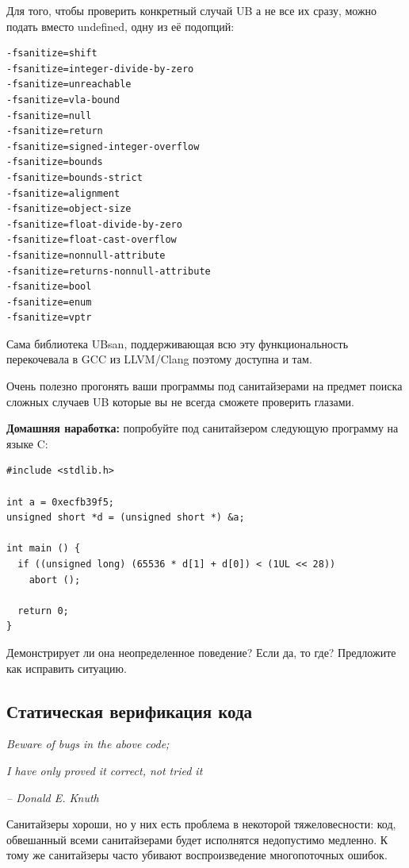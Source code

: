 \documentclass[a4paper,12pt,oneside]{book}
\begin{document}
Для того, чтобы проверить конкретный случай UB а не все их сразу, можно подать вместо undefined, одну из её подопций:

\begin{lstlisting}
-fsanitize=shift
-fsanitize=integer-divide-by-zero
-fsanitize=unreachable
-fsanitize=vla-bound
-fsanitize=null
-fsanitize=return
-fsanitize=signed-integer-overflow
-fsanitize=bounds
-fsanitize=bounds-strict
-fsanitize=alignment
-fsanitize=object-size
-fsanitize=float-divide-by-zero
-fsanitize=float-cast-overflow
-fsanitize=nonnull-attribute
-fsanitize=returns-nonnull-attribute
-fsanitize=bool
-fsanitize=enum
-fsanitize=vptr
\end{lstlisting}

Сама библиотека UBsan, поддерживающая всю эту функциональность перекочевала в GCC из LLVM/Clang поэтому доступна и там.

Очень полезно прогонять ваши программы под санитайзерами на предмет поиска сложных случаев UB которые вы не всегда сможете проверить глазами.

\textbf{Домашняя наработка:} попробуйте под санитайзером следующую программу на языке C:

\begin{lstlisting}
#include <stdlib.h>

int a = 0xecfb39f5;
unsigned short *d = (unsigned short *) &a;

int main () {
  if ((unsigned long) (65536 * d[1] + d[0]) < (1UL << 28))
    abort ();

  return 0;
}
\end{lstlisting}\label{lst:HWUB}

Демонстрирует ли она неопределенное поведение? Если да, то где? Предложите как исправить ситуацию.

\subsection{Статическая верификация кода}

\hfill\textit{Beware of bugs in the above code;}

\hfill\textit{I have only proved it correct, not tried it}{\vspace{0.5em}}

\hfill\textit{-- Donald E. Knuth}

Санитайзеры хороши, но у них есть проблема в некоторой тяжеловесности: код, обвешанный всеми санитайзерами будет исполнятся недопустимо медленно. К тому же санитайзеры часто убивают воспроизведение многопоточных ошибок.
\end{document}
